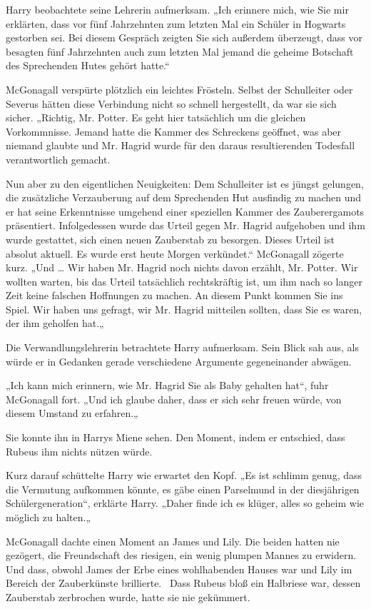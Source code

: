 {Harry beobachtete seine Lehrerin aufmerksam. „Ich erinnere mich, wie Sie mir erklärten, dass vor fünf Jahrzehnten zum letzten Mal ein Schüler in Hogwarts gestorben sei. Bei diesem Gespräch zeigten Sie sich außerdem überzeugt, dass vor besagten fünf Jahrzehnten auch zum letzten Mal jemand die geheime Botschaft des Sprechenden Hutes gehört hatte.“

McGonagall verspürte plötzlich ein leichtes Frösteln. Selbst der Schulleiter oder Severus hätten diese Verbindung nicht so schnell hergestellt, da war sie sich sicher. „Richtig, Mr. Potter. Es geht hier tatsächlich um die gleichen Vorkommnisse. Jemand hatte die Kammer des Schreckens geöffnet, was aber niemand glaubte und Mr. Hagrid wurde für den daraus resultierenden Todesfall verantwortlich gemacht.

Nun aber zu den eigentlichen Neuigkeiten: Dem Schulleiter ist es jüngst gelungen, die zusätzliche Verzauberung auf dem Sprechenden Hut ausfindig zu machen und er hat seine Erkenntnisse umgehend einer speziellen Kammer des Zauberergamots präsentiert. Infolgedessen wurde das Urteil gegen Mr. Hagrid aufgehoben und ihm wurde gestattet, sich einen neuen Zauberstab zu besorgen. Dieses Urteil ist absolut aktuell. Es wurde erst heute Morgen verkündet.“ McGonagall zögerte kurz. „Und … Wir haben Mr. Hagrid noch nichts davon erzählt, Mr. Potter. Wir wollten warten, bis das Urteil tatsächlich rechtskräftig ist, um ihm nach so langer Zeit keine falschen Hoffnungen zu machen. An diesem Punkt kommen Sie ins Spiel. Wir haben uns gefragt, wir Mr. Hagrid mitteilen sollten, dass Sie es waren, der ihm geholfen hat.„

Die Verwandlungslehrerin betrachtete Harry aufmerksam. Sein Blick sah aus, als würde er in Gedanken gerade verschiedene Argumente gegeneinander abwägen.

„Ich kann mich erinnern, wie Mr. Hagrid Sie als Baby gehalten hat“, fuhr McGonagall fort. „Und ich glaube daher, dass er sich sehr freuen würde, von diesem Umstand zu erfahren.„

Sie konnte ihn in Harrys Miene sehen. Den Moment, indem er entschied, dass Rubeus ihm nichts nützen würde.

Kurz darauf schüttelte Harry wie erwartet den Kopf. „Es ist schlimm genug, dass die Vermutung aufkommen könnte, es gäbe einen Parselmund in der diesjährigen Schülergeneration“, erklärte Harry. „Daher finde ich es klüger, alles so geheim wie möglich zu halten.„

McGonagall dachte einen Moment an James und Lily. Die beiden hatten nie gezögert, die Freundschaft des riesigen, ein wenig plumpen Mannes zu erwidern. Und dass, obwohl James der Erbe eines wohlhabenden Hauses war und Lily im Bereich der Zauberkünste brillierte. ~Dass Rubeus bloß ein Halbriese war, dessen Zauberstab zerbrochen wurde, hatte sie nie gekümmert.

}
